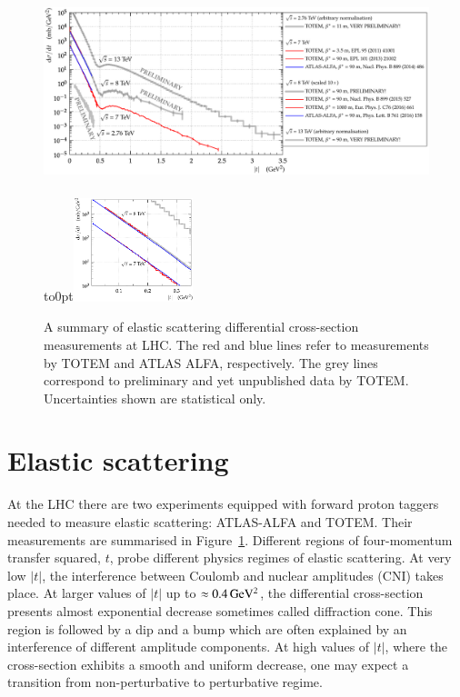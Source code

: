 \documentclass{webofc}
\def\un#1{\,{\rm #1}}
\begin{document}
\begin{figure}[h]
\centering
\includegraphics[height=6cm,clip]{fig/es_summary.pdf}
\vbox to0pt{\vss\includegraphics[height=3cm,clip]{fig/es_summary_detail_cone.pdf}\vskip3.3cm}
\vskip-7mm
\caption{A summary of elastic scattering differential cross-section measurements at LHC. The red and blue lines refer to measurements by TOTEM and ATLAS ALFA, respectively. The grey lines correspond to preliminary and yet unpublished data by TOTEM. Uncertainties shown are statistical only.}
\label{f:es summary}
\end{figure}

\section{Elastic scattering}
\label{s:es}

At the LHC there are two experiments equipped with forward proton taggers needed to measure elastic scattering: ATLAS-ALFA and TOTEM. Their measurements are summarised in Figure~\ref{f:es summary}. Different regions of four-momentum transfer squared, $t$, probe different physics regimes of elastic scattering. At very low $|t|$, the interference between Coulomb and nuclear amplitudes (CNI) takes place. At larger values of $|t|$ up to $\approx 0.4\un{GeV^2}$, the differential cross-section presents almost exponential decrease sometimes called diffraction cone. This region is followed by a dip and a bump which are often explained by an interference of different amplitude components. At high values of $|t|$, where the cross-section exhibits a smooth and uniform decrease, one may expect a transition from non-perturbative to perturbative regime.
\end{document}
